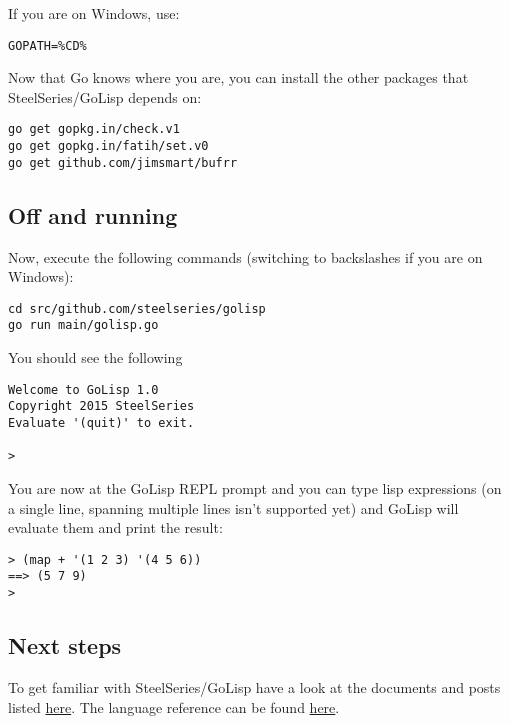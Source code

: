 \documentclass{scrartcl}
\begin{document}
If you are on Windows, use:

\begin{verbatim}GOPATH=%CD%
\end{verbatim}

Now that Go knows where you are, you can install the other packages that SteelSeries/GoLisp depends on:

\begin{verbatim}go get gopkg.in/check.v1
go get gopkg.in/fatih/set.v0
go get github.com/jimsmart/bufrr
\end{verbatim}

\subsection{Off and running}\hypertarget{off-and-running}{}\label{off-and-running}

Now, execute the following commands (switching to backslashes if you are on Windows):

\begin{verbatim}cd src/github.com/steelseries/golisp
go run main/golisp.go
\end{verbatim}

You should see the following

\begin{verbatim}Welcome to GoLisp 1.0
Copyright 2015 SteelSeries
Evaluate '(quit)' to exit.

>
\end{verbatim}

You are now at the GoLisp REPL prompt and you can type lisp expressions (on a single line, spanning multiple lines isn't supported yet) and GoLisp will evaluate them and print the result:

\begin{verbatim}> (map + '(1 2 3) '(4 5 6))
==> (5 7 9)
>
\end{verbatim}

\subsection{Next steps}\hypertarget{next-steps}{}\label{next-steps}

To get familiar with SteelSeries/GoLisp have a look at the documents and posts listed \href{documents.html}{here}. The language reference can be found \href{language-ref.html}{here}.
\end{document}
